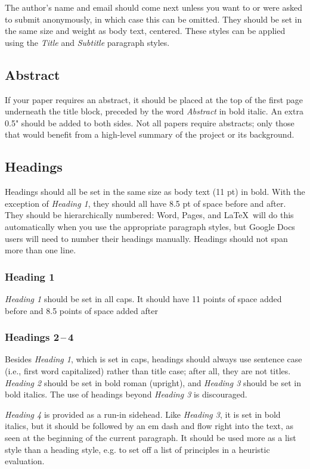 \documentclass[
	letterpaper, %
]{jdf}
\begin{document}
The author’s name and email should come next unless you want to or were asked to submit anonymously, in which case this can be omitted. 
They should be set in the same size and weight as body text, centered. These styles can be applied using the \emph{Title} and \emph{Subtitle} paragraph styles.

\subsection{Abstract}
If your paper requires an abstract, it should be placed at the top of the first page underneath the title block, preceded by the word \emph{Abstract} in bold italic. 
An extra 0.5" should be added to both sides. Not all papers require abstracts; only those that would benefit from a high-level summary of the project or its background.

\subsection{Headings}
Headings should all be set in the same size as body text (11 pt) in bold. With the exception of \emph{Heading 1}, they should all have 8.5 pt of space before and after. 
They should be hierarchically numbered: Word, Pages, and \LaTeX\ will do this automatically when you use the appropriate paragraph styles, but Google Docs users will need to 
number their headings manually. Headings should not span more than one line.

\subsubsection{Heading 1}
\emph{Heading 1} should be set in all caps. It should have 11 points of space added before and 8.5 points of space added after

\subsubsection{Headings 2\,–\,4}
Besides \emph{Heading 1}, which is set in caps, headings should always use sentence case (i.e., first word capitalized) rather than title case; after all, they are not titles. 
\emph{Heading 2} should be set in bold roman (upright), and \emph{Heading 3} should be set in bold italics. The use of headings beyond \emph{Heading 3} is discouraged.

\emph{Heading 4} is provided as a run-in sidehead. Like \emph{Heading 3}, it is set in bold italics, but it should be followed by an em dash and flow right into the text, 
as seen at the beginning of the current paragraph. It should be used more as a list style than a heading style, e.g. to set off a list of principles in a heuristic evaluation.
\end{document}
